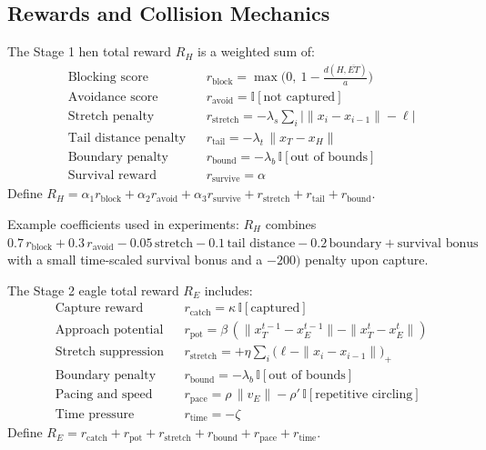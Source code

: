 \documentclass[12pt]{article}
\begin{document}
\subsection{Rewards and Collision Mechanics}
The Stage 1 hen total reward \(R_H\) is a weighted sum of:
\begin{align}
&\text{Blocking score}&& r_{\text{block}}=\max\bigl(0,\ 1-\tfrac{d(H,\overline{ET})}{a}\bigr) \tag{1}\\
&\text{Avoidance score}&& r_{\text{avoid}}=\mathbb{I}[\text{not captured}] \tag{2}\\
&\text{Stretch penalty}&& r_{\text{stretch}}=-\lambda_s\sum_{i} \bigl|\|x_i-x_{i-1}\|-\ell\bigr| \tag{3}\\
&\text{Tail distance penalty}&& r_{\text{tail}}=-\lambda_t\,\|x_T-x_H\| \tag{4}\\
&\text{Boundary penalty}&& r_{\text{bound}}=-\lambda_b\,\mathbb{I}[\text{out of bounds}] \tag{5}\\
&\text{Survival reward}&& r_{\text{survive}}=\alpha \tag{6}
\end{align}
Define \(R_H=\alpha_1 r_{\text{block}}+\alpha_2 r_{\text{avoid}}+\alpha_3 r_{\text{survive}}+r_{\text{stretch}}+r_{\text{tail}}+r_{\text{bound}}\).

Example coefficients used in experiments: \(R_H\) combines \(0.7\,r_{\text{block}}+0.3\,r_{\text{avoid}}-0.05\,\text{stretch}-0.1\,\text{tail distance}-0.2\,\text{boundary}+\text{survival bonus}\) with a small time-scaled survival bonus and a \(-200)\) penalty upon capture.

The Stage 2 eagle total reward \(R_E\) includes:
\begin{align}
&\text{Capture reward}&& r_{\text{catch}}=\kappa\,\mathbb{I}[\text{captured}] \tag{7}\\
&\text{Approach potential}&& r_{\text{pot}}=\beta\,(\|x_{T}^{t-1}-x_{E}^{t-1}\|-\|x_T^{t}-x_E^{t}\|) \tag{8}\\
&\text{Stretch suppression}&& r_{\text{stretch}}=+\eta\sum_{i}\bigl(\ell-\|x_i-x_{i-1}\|\bigr)_{+} \tag{9}\\
&\text{Boundary penalty}&& r_{\text{bound}}=-\lambda_b\,\mathbb{I}[\text{out of bounds}] \tag{10}\\
&\text{Pacing and speed}&& r_{\text{pace}}=\rho\,\|v_E\|-\rho'\,\mathbb{I}[\text{repetitive circling}] \tag{11}\\
&\text{Time pressure}&& r_{\text{time}}=-\zeta \tag{12}
\end{align}
Define \(R_E=r_{\text{catch}}+r_{\text{pot}}+r_{\text{stretch}}+r_{\text{bound}}+r_{\text{pace}}+r_{\text{time}}\).
\end{document}
